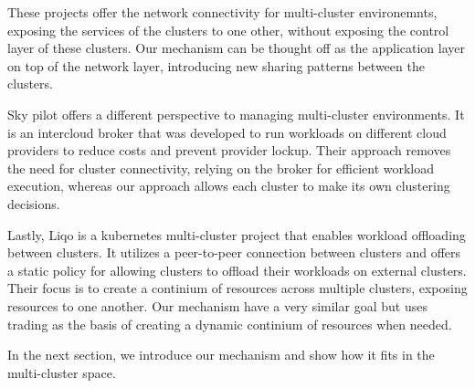 These projects offer the network connectivity for multi-cluster environemnts,
exposing the services of the clusters to one other, without exposing the
control layer of these clusters. Our mechanism can be thought off as the application layer on top of the network layer, introducing new sharing patterns between the clusters.

Sky pilot offers a different perspective to managing multi-cluster
environments. It is an intercloud broker that was developed to run workloads on
different cloud providers to reduce costs and prevent provider lockup. Their
approach removes the need for cluster connectivity, relying on the
broker for efficient workload execution, whereas our approach allows each
cluster to make its own clustering decisions.

Lastly, Liqo is a kubernetes multi-cluster project that enables workload
offloading between clusters. It utilizes a peer-to-peer connection between
clusters and offers a static policy for allowing clusters to offload their
workloads on external clusters. Their focus is to create a continium of
resources across multiple clusters, exposing resources to one another. Our mechanism have a very similar goal but uses trading as the basis of creating a dynamic continium of resources when needed.  

In the next section, we introduce our mechanism and show how it fits in the
multi-cluster space.
